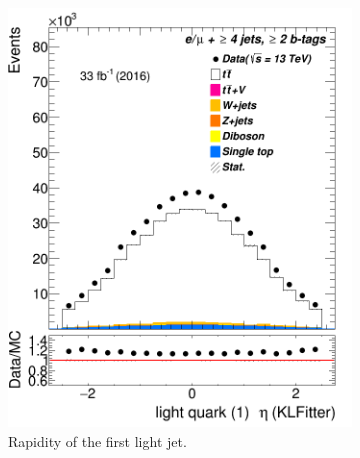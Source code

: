 \begin{figure}
\begin{subfigure}{0.25\textwidth}
	\includegraphics[width=\linewidth]{ControlPlots_emujets_2016_4incl_2incl/klf_lq1_eta_emujets_2016.png}
	\caption{Rapidity of the first light jet.} \label{fig:K37}
\end{subfigure}
\hspace*{0.5cm}
	\begin{subfigure}{0.25\textwidth}

\end{subfigure}
\end{figure}
